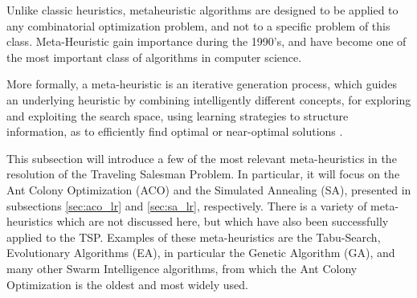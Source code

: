 Unlike classic heuristics, metaheuristic algorithms are designed to be applied to any combinatorial optimization problem, and not to a specific problem of this class. Meta-Heuristic gain importance during the 1990's, and have become one of the most important class of algorithms in computer science.

More formally, a meta-heuristic is an iterative generation process, which guides an underlying heuristic by combining intelligently different concepts, for exploring and exploiting the search space, using learning strategies to structure information, as to efficiently find optimal or near-optimal solutions \cite{metaheuristics_overview}.

This subsection will introduce a few of the most relevant meta-heuristics in the resolution of the Traveling Salesman Problem. In particular, it will focus on the Ant Colony Optimization (ACO) and the Simulated Annealing (SA), presented in subsections \ref{sec:aco_lr} and \ref{sec:sa_lr}, respectively. There is a variety of meta-heuristics which are not discussed here, but which have also been successfully applied to the TSP. Examples of these meta-heuristics are the Tabu-Search, Evolutionary Algorithms (EA), in particular the Genetic Algorithm (GA), and many other Swarm Intelligence algorithms, from which the Ant Colony Optimization is the oldest and most widely used.

